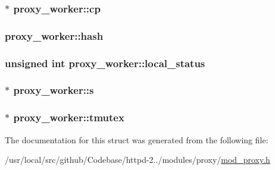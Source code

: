 \subsubsection[{\texorpdfstring{cp}{cp}}]{$\ast$ proxy\+\_\+worker\+::cp}\hypertarget{structproxy__worker_aa3b1761756ad260fc52589501c9f6fe0}{}\label{structproxy__worker_aa3b1761756ad260fc52589501c9f6fe0}
\subsubsection[{\texorpdfstring{hash}{hash}}]{ proxy\+\_\+worker\+::hash}\hypertarget{structproxy__worker_aeb87335d8fe0fd672be44b1e51c425ad}{}\label{structproxy__worker_aeb87335d8fe0fd672be44b1e51c425ad}
\subsubsection[{\texorpdfstring{local\+\_\+status}{local_status}}]{\setlength{\rightskip}{0pt plus 5cm}unsigned {\bf int} proxy\+\_\+worker\+::local\+\_\+status}\hypertarget{structproxy__worker_a1b27e893cb365cbce9f37f9dac69e144}{}\label{structproxy__worker_a1b27e893cb365cbce9f37f9dac69e144}
\subsubsection[{\texorpdfstring{s}{s}}]{$\ast$ proxy\+\_\+worker\+::s}\hypertarget{structproxy__worker_abeaebad014908a4f108fba27313187aa}{}\label{structproxy__worker_abeaebad014908a4f108fba27313187aa}
\subsubsection[{\texorpdfstring{tmutex}{tmutex}}]{$\ast$ proxy\+\_\+worker\+::tmutex}\hypertarget{structproxy__worker_a5920bfc1c36a8af7f19f2e9cab91a373}{}\label{structproxy__worker_a5920bfc1c36a8af7f19f2e9cab91a373}


The documentation for this struct was generated from the following file\+:\begin{DoxyCompactItemize}
\item 
/usr/local/src/github/\+Codebase/httpd-\/2../modules/proxy/\hyperlink{mod__proxy_8h}{mod\+\_\+proxy.\+h}\end{DoxyCompactItemize}
